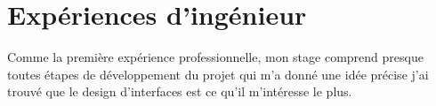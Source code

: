 \section{Expériences d'ingénieur}

Comme la première expérience professionnelle, mon stage comprend presque toutes étapes de développement du projet qui m'a donné une idée précise  j'ai trouvé que le design d'interfaces est ce qu'il m'intéresse le plus.
